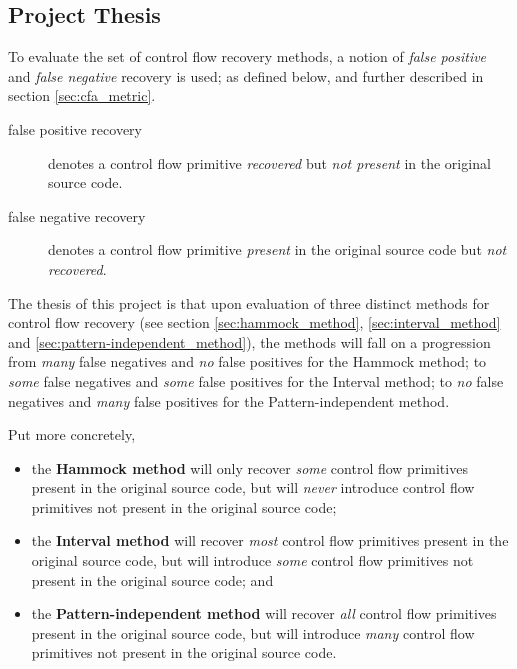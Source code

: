 
\subsection{Project Thesis}


To evaluate the set of control flow recovery methods, a notion of \textit{false positive} and \textit{false negative} recovery is used; as defined below, and further described in section \ref{sec:cfa_metric}.

\begin{description}
	\item[false positive recovery] denotes a control flow primitive \textit{recovered} but \textit{not present} in the original source code.
	\item[false negative recovery] denotes a control flow primitive \textit{present} in the original source code but \textit{not recovered}.
\end{description}

The thesis of this project is that upon evaluation of three distinct methods for control flow recovery (see section \ref{sec:hammock_method}, \ref{sec:interval_method} and \ref{sec:pattern-independent_method}), the methods will fall on a progression from \textit{many} false negatives and \textit{no} false positives for the Hammock method; to \textit{some} false negatives and \textit{some} false positives for the Interval method; to \textit{no} false negatives and \textit{many} false positives for the Pattern-independent method.

Put more concretely,
\begin{itemize}
	\item the \textbf{Hammock method} will only recover \textit{some} control flow primitives present in the original source code, but will \textit{never} introduce control flow primitives not present in the original source code;
	\item the \textbf{Interval method} will recover \textit{most} control flow primitives present in the original source code, but will introduce \textit{some} control flow primitives not present in the original source code; and
	\item the \textbf{Pattern-independent method} will recover \textit{all} control flow primitives present in the original source code, but will introduce \textit{many} control flow primitives not present in the original source code.
\end{itemize}
